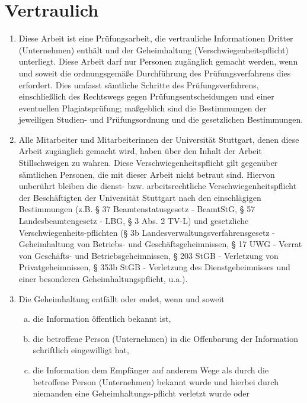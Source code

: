 
%

\section*{Vertraulich}

\begin{enumerate}
  \small
  \item Diese Arbeit ist eine Prüfungsarbeit, die vertrauliche Informationen Dritter (Unternehmen) enthält und der Geheimhaltung (Verschwiegenheitspflicht) unterliegt. Diese Arbeit darf nur Personen zugänglich gemacht werden, wenn und soweit die ordnungsgemäße Durchführung des Prüfungsverfahrens dies erfordert. Dies umfasst sämtliche Schritte des Prüfungsverfahrens, einschließlich des Rechtswegs gegen Prüfungsentscheidungen und einer eventuellen Plagiatsprüfung; maßgeblich sind die Bestimmungen der jeweiligen Studien- und Prüfungsordnung und die gesetzlichen Bestimmungen.
  \item Alle Mitarbeiter und Mitarbeiterinnen der Universität Stuttgart, denen diese Arbeit zugänglich gemacht wird, haben über den Inhalt der Arbeit Stillschweigen zu wahren. Diese Verschwiegenheitspflicht gilt gegenüber sämtlichen Personen, die mit dieser Arbeit nicht betraut sind. Hiervon unberührt bleiben die dienst- bzw. arbeitsrechtliche Verschwiegenheitspflicht der Beschäftigten der Universität Stuttgart nach den einschlägigen Bestimmungen (z.B. § 37 Beamtenstatusgesetz - BeamtStG, § 57 Landesbeamtengesetz - LBG, § 3 Abs. 2 TV-L) und gesetzliche Verschwiegenheits-pflichten (§ 3b Landesverwaltungsverfahrensgesetz - Geheimhaltung von Betriebs- und Geschäftsgeheimnissen, § 17 UWG - Verrat von Geschäfts- und Betriebsgeheimnissen, § 203 StGB - Verletzung von Privatgeheimnissen, § 353b StGB - Verletzung des Dienstgeheimnisses und einer besonderen Geheimhaltungspflicht, u.a.).
  \item Die Geheimhaltung entfällt oder endet, wenn und soweit
  \begin{enumerate} [a)] \vspace{-6pt}
    \item die Information öffentlich bekannt ist,
    \item die betroffene Person (Unternehmen) in die Offenbarung der Information schriftlich eingewilligt hat,
    \item die Information dem Empfänger auf anderem Wege als durch die betroffene Person (Unternehmen) bekannt wurde und hierbei durch niemanden eine Geheimhaltungs-pflicht verletzt wurde oder

\end{enumerate}
\end{enumerate}
